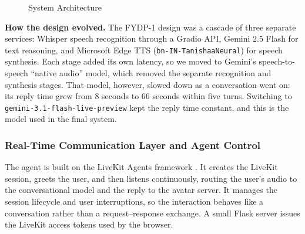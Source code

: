 \begin{figure}[H]
{}
    \caption{System Architecture}
    \label{fig:SystemArchitecture}
\end{figure}

\noindent
\textbf{How the design evolved.} The FYDP-1 design was a cascade of three separate services: Whisper speech recognition through a Gradio API, Gemini 2.5 Flash for text reasoning, and Microsoft Edge TTS (\texttt{bn-IN-TanishaaNeural}) for speech synthesis. Each stage added its own latency, so we moved to Gemini's speech-to-speech ``native audio'' model, which removed the separate recognition and synthesis stages. That model, however, slowed down as a conversation went on: its reply time grew from 8 seconds to 66 seconds within five turns. Switching to \texttt{gemini-3.1-flash-live-preview} kept the reply time constant, and this is the model used in the final system.

\vspace{0.5em}

\subsubsection{Real-Time Communication Layer and Agent Control}

The agent is built on the LiveKit Agents framework \cite{livekitagents}. It creates the LiveKit session, greets the user, and then listens continuously, routing the user's audio to the conversational model and the reply to the avatar server. It manages the session lifecycle and user interruptions, so the interaction behaves like a conversation rather than a request--response exchange. A small Flask server issues the LiveKit access tokens used by the browser.

\vspace{0.5em}

